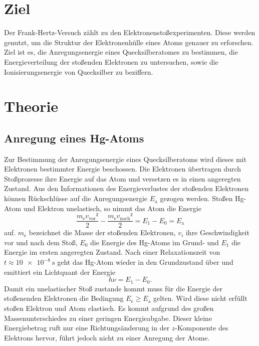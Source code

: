 \section{Ziel}
\label{sec:Ziel}
Der Frank-Hertz-Versuch zählt zu den Elektronenstoßexperimenten. 
Diese werden genutzt, um die Struktur der Elektronenhülle eines Atoms genauer zu erforschen.
Ziel ist es, die Anregungsenergie eines Quecksilberatomes zu bestimmen, die Energieverteilung der stoßenden Elektronen zu untersuchen, sowie die Ionisierungsenergie von Quecksilber zu beziffern.

\section{Theorie}
\label{sec:Theorie}
\subsection{Anregung eines Hg-Atoms}
Zur Bestimmung der Anregungsenergie eines Quecksilberatoms wird dieses mit Elektronen bestimmter Energie beschossen.
Die Elektronen übertragen durch Stoßprozesse ihre Energie auf das Atom und versetzen es in einen angeregten Zustand.
Aus den Informationen des Energieverlustes der stoßenden Elektronen können Rückschlüsse auf die Anregungsenergie $E_\mathup{a}$ gezogen werden. 
Stoßen Hg-Atom und Elektron unelastisch, so nimmt das Atom die Energie
\begin{equation}
	\label{eq:E_a}
	\frac{m_\mathup{e} v_\mathup{vor}²}{2}-\frac{m_\mathup{e} 	v_\mathup{nach}²}{2}=E_1-E_0=E_\mathup{a}
\end{equation}
auf.
$m_\mathup{e}$ bezeichnet die Masse der stoßenden Elektronen, $v_i$ ihre Geschwindigkeit vor und nach dem Stoß, $E_0$ die Energie des Hg-Atoms im Grund- und $E_1$ die Energie im ersten angeregten Zustand. 
Nach einer Relaxationszeit von $t \approx \SI{10e-8}{\second}$ geht das Hg-Atom wieder in den Grundzustand über und emittiert ein Lichtquant der Energie
\begin{equation}
	h \nu =E_1-E_0.
\end{equation} 
Damit ein unelastischer Stoß zustande kommt muss für die Energie der stoßenenden Elektronen die Bedingung $E_\mathup{e} \geq E_\mathup{a}$ gelten. 
Wird diese nicht erfüllt stoßen Elektron und Atom elastisch. 
Es kommt aufgrund des großen Massenunterschiedes zu einer geringen Energieabgabe.
Dieser kleine Energiebetrag ruft nur eine Richtungsänderung in der $z$-Komponente des Elektrons hervor, führt jedoch nicht zu einer Anregung der Atome.

